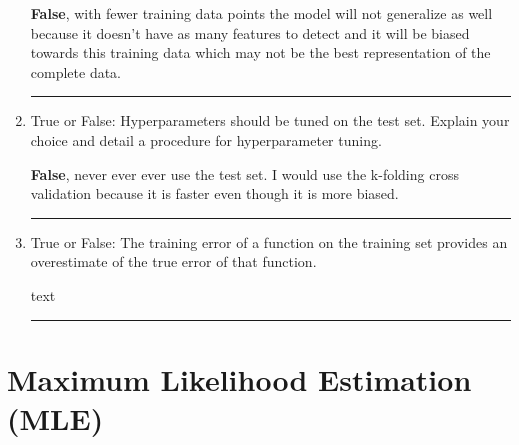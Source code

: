 \documentclass{article}
\begin{document}
\begin{aprob}
\begin{enumerate}
        \textbf{False}, with fewer training data points the model will not generalize as well because it doesn't have as many features to detect and it will be biased towards this training data which may not be the best representation of the complete data.

        \rule{\textwidth}{0.25pt}
        \newpage
        \item {} True or False: Hyperparameters should be tuned on the test set. Explain your choice and detail a procedure for hyperparameter tuning.

        \textbf{False}, never ever ever use the test set. I would use the k-folding cross validation because it is faster even though it is more biased. 

        \rule{\textwidth}{0.25pt}
        \newpage
        \item {} True or False: The training error of a function on the training set provides an overestimate of the true error of that function.

        text

        \rule{\textwidth}{0.25pt}
        \newpage
    \end{enumerate}

\end{aprob}

\section*{Maximum Likelihood Estimation (MLE)}
\end{document}
